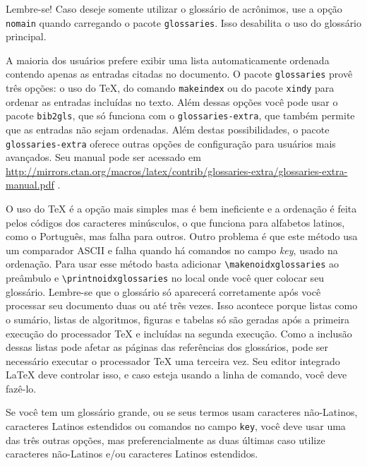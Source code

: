 \begin{bclogo}[
	couleur=bgblue,
	arrondi=0,
	logo=\faWarning,
	barre=none,
	noborder=true]{Lembre-se!}
	Caso deseje somente utilizar o glossário de acrônimos, use a opção \texttt{nomain} quando carregando o pacote \texttt{glossaries}. Isso desabilita o uso do glossário principal.
\end{bclogo}

A maioria dos usuários prefere exibir uma lista automaticamente ordenada contendo apenas as entradas citadas no documento. O pacote \texttt{glossaries} provê três opções: o uso do \TeX{}, do comando \texttt{makeindex} ou do pacote \texttt{xindy} para ordenar as entradas incluídas no texto.  Além dessas opções você pode usar o pacote \texttt{bib2gls}, que só funciona com o \texttt{glossaries-extra}, que também permite que as entradas não sejam ordenadas. Além destas possibilidades, o pacote \texttt{glossaries-extra} oferece outras opções de configuração para usuários mais avançados. Seu manual pode ser acessado em \url{http://mirrors.ctan.org/macros/latex/contrib/glossaries-extra/glossaries-extra-manual.pdf} \parencite{glossaries-extra}.

O uso do \TeX{} é a opção mais simples mas é bem ineficiente e a ordenação é feita pelos códigos dos caracteres minúsculos, o que funciona para alfabetos latinos, como o Português, mas falha para outros. Outro problema é que este método usa um comparador ASCII e falha quando há comandos no campo \textit{key}, usado na ordenação. Para usar esse método basta adicionar \texttt{\textbackslash{}makenoidxglossaries} ao preâmbulo e \texttt{\textbackslash{}printnoidxglossaries} no local onde você quer colocar seu glossário. Lembre-se que o glossário só aparecerá corretamente após você processar seu documento duas ou até três vezes. Isso acontece porque listas como o sumário, listas de algoritmos, figuras e tabelas só são geradas após a primeira execução do processador \TeX{} e incluídas na segunda execução. Como a inclusão dessas listas pode afetar as páginas das referências dos glossários, pode ser necessário executar o processador \TeX{} uma terceira vez. Seu editor integrado \LaTeX{} deve controlar isso, e caso esteja usando a linha de comando, você deve fazê-lo. 

Se você tem um glossário grande, ou se seus termos usam caracteres não-Latinos, caracteres Latinos estendidos ou comandos no campo \texttt{key}, você deve usar uma das três outras opções, mas preferencialmente as duas últimas caso utilize caracteres não-Latinos e/ou caracteres Latinos estendidos.

